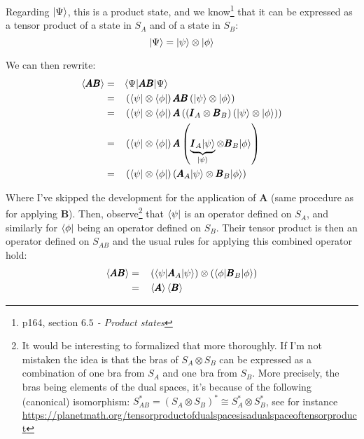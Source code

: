 \documentclass[solutions.tex]{subfiles}
\begin{document}
Regarding $|\Psi\rangle$, this is a product state, and we know\footnote{%
p164, section \textit{$6.5$ - Product states}} that it can be expressed
as a tensor product of a state in $S_A$ and of a state in $S_B$:
\[
	|\Psi\rangle = |\psi\rangle\otimes|\phi\rangle
\]

We can then rewrite:
\begin{equation*}\begin{aligned}
	\left\langle \pmb{AB} \right\rangle &=&& \langle \Psi|\pmb{AB}|\Psi\rangle \\
	~ &=&& \left(\langle \psi|\otimes\langle \phi|\right)
		\pmb{AB}\left(|\psi\rangle\otimes|\phi\rangle\right) \\
	~ &=&& \left(\langle \psi|\otimes\langle \phi|\right)
		\pmb{A}\left(
			(\pmb{I}_A\otimes\pmb{B}_B)\left(|\psi\rangle\otimes|\phi\rangle\right)
		\right) \\
	~ &=&& \left(\langle \psi|\otimes\langle \phi|\right)
		\pmb{A}\left(\underbrace{\pmb{I}_A|\psi\rangle}_{|\psi\rangle}
			\otimes\pmb{B}_B|\phi\rangle\right) \\
	~ &=&& \left(\langle \psi|\otimes\langle \phi|\right)
		\left(\pmb{A}_A|\psi\rangle\otimes\pmb{B}_B|\phi\rangle\right) \\
\end{aligned}\end{equation*}

Where I've skipped the development for the application of
$\bm{A}$ (same procedure as for applying $\bm{B}$). Then,
observe\footnote{It would be interesting to formalized that more thoroughly.
If I'm not mistaken the idea is that the bras of $S_A\otimes S_B$ can be
expressed as a combination of one bra from $S_A$ and one bra from $S_B$.
More precisely, the bras being elements of the dual spaces, it's because
of the following (canonical) isomorphism:
$S_{AB}^* = (S_A\otimes S_B)^* \cong S_A^*\otimes S_B^*$, see for instance
\url{https://planetmath.org/tensorproductofdualspacesisadualspaceoftensorproduct}}
that $\langle \psi|$ is an operator defined on $S_A$, and similarly for
$\langle \phi|$ being an operator defined on $S_B$. Their tensor product is
then an operator defined on $S_{AB}$ and the usual rules for applying this
combined operator hold:
\begin{equation*}\begin{aligned}
	\left\langle \pmb{AB} \right\rangle &=&&
		\left(\langle \psi|\pmb{A}_A|\psi\rangle\right)
		\otimes
		\left(\langle \phi|\pmb{B}_B|\phi\rangle\right) \\
	~ &=&& \left\langle \pmb{A} \right\rangle\left\langle \pmb{B} \right\rangle \\
\end{aligned}\end{equation*}
\end{document}
